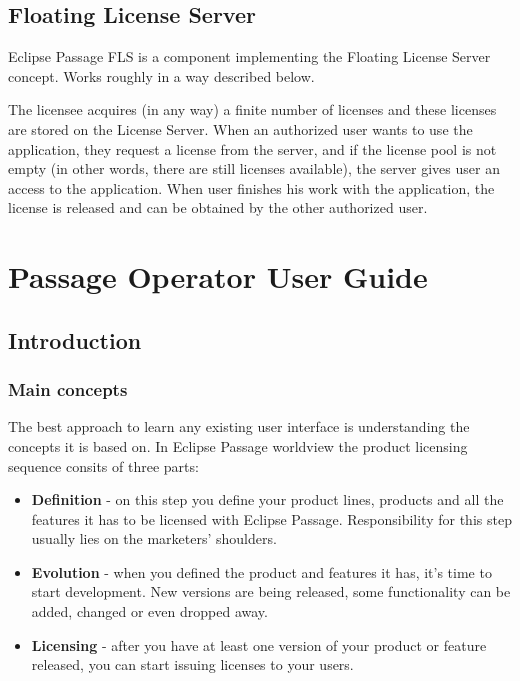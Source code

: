 \documentclass[12pt]{report}
\begin{document}
\section*{Floating License Server}

Eclipse Passage FLS is a component implementing the Floating License Server concept. Works roughly in a way described below.

The licensee acquires (in any way) a finite number of licenses and these licenses are stored on the License Server. When an authorized user wants to use the application,
they request a license from the server, and if the license pool is not empty (in other words, there are still licenses available), the server gives user an access to the
application. When user finishes his work with the application, the license is released and can be obtained by the other authorized user.

\chapter*{Passage Operator User Guide}

\section*{Introduction}

\subsection*{Main concepts}

The best approach to learn any existing user interface is understanding the concepts it is based on. In Eclipse Passage worldview the product licensing sequence consits of three parts:

\begin{itemize}
    \item \textbf{Definition} - on this step you define your product lines, products and all the features it has to be licensed with Eclipse Passage. Responsibility for this step usually lies on the marketers' shoulders.
    \item \textbf{Evolution} - when you defined the product and features it has, it's time to start development. New versions are being released, some functionality can be added, changed or even dropped away.
    \item \textbf{Licensing} - after you have at least one version of your product or feature released, you can start issuing licenses to your users.
\end{itemize}
\end{document}
